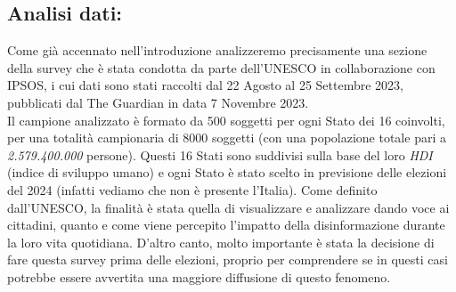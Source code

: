 \documentclass{article}
\begin{document}
\newpage\centering\subsection{Analisi dati:}

\begin{justify}    
Come già accennato nell'introduzione analizzeremo precisamente una sezione della survey che è stata condotta da parte dell'UNESCO in collaborazione con IPSOS, i cui dati sono stati raccolti dal 22 Agosto al 25 Settembre 2023, pubblicati dal The Guardian in data 7 Novembre 2023. \citep{Unesco}\\
Il campione analizzato è formato da 500 soggetti per ogni Stato dei 16 coinvolti, per una totalità campionaria di 8000 soggetti (con una popolazione totale pari a \textit{2.579.400.000} persone).
Questi 16 Stati sono suddivisi sulla base del loro \textit{HDI} (indice di sviluppo umano) e ogni Stato è stato scelto in previsione delle elezioni del 2024 (infatti vediamo che non è presente l'Italia).
Come definito dall'UNESCO, la finalità è stata quella di visualizzare e analizzare dando voce ai cittadini, quanto e come viene percepito l'impatto della disinformazione durante la loro vita quotidiana. D'altro canto, molto importante è stata la decisione di fare questa survey prima delle elezioni, proprio per comprendere se in questi casi potrebbe essere avvertita una maggiore diffusione di questo fenomeno.
\end{justify}
\end{document}
